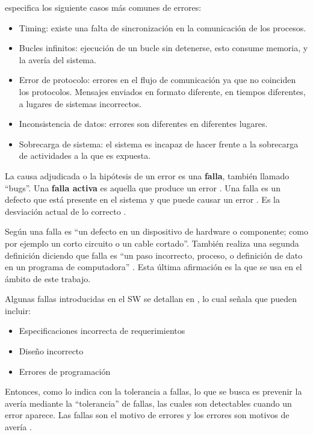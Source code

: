 \cite{Hanmer07} especifica los siguiente casos más comunes de errores:
\begin{itemize}
 \item Timing: existe una falta de sincronización en la comunicación de los procesos.
 \item Bucles infinitos: ejecución de un bucle sin detenerse, esto consume memoria, y la
avería del sistema.
 \item Error de protocolo: errores en el flujo de comunicación ya que no coinciden los 
protocolos. Mensajes enviados en formato diferente, en tiempos diferentes, a lugares de sistemas 
incorrectos.
 \item Inconsistencia de datos: errores son diferentes en diferentes lugares.
 \item Sobrecarga de sistema: el sistema es incapaz de hacer frente a la sobrecarga de 
actividades a la que es expuesta.
\end{itemize}

La causa adjudicada o la hipótesis de un error es una \textbf{falla}, también llamado ``bugs''. Una 
\textbf{falla activa} es aquella que produce un error \citep{Pullum01}. Una falla es un defecto que está 
presente en el sistema y que puede causar un error \citep{Hanmer07}. Es la desviación actual de lo 
correcto \cite{Hanmer07}.

Según \cite{IEEE610.12} una falla es ``un defecto en un dispositivo de hardware o componente; como 
por ejemplo un corto circuito o un cable cortado''. También realiza una segunda definición diciendo 
que falla es ``un paso incorrecto, proceso, o definición de dato en un programa de computadora'' 
\cite{IEEE610.12}. Esta última afirmación es la que se usa en el ámbito de este trabajo.

Algunas fallas introducidas en el \ac{SW} se detallan en \cite{Hanmer07}, lo cual señala que 
pueden incluir:
\begin{itemize}
 \item Especificaciones incorrecta de requerimientos
 \item Diseño incorrecto
 \item Errores de programación
\end{itemize}

Entonces, como lo indica \cite{Pullum01} con la tolerancia a fallas, lo que se busca es prevenir la 
avería mediante la ``tolerancia'' de fallas, las cuales son detectables cuando un error aparece. 
Las fallas son el motivo de errores y los errores son motivos de avería \citep{FTDesign}.

